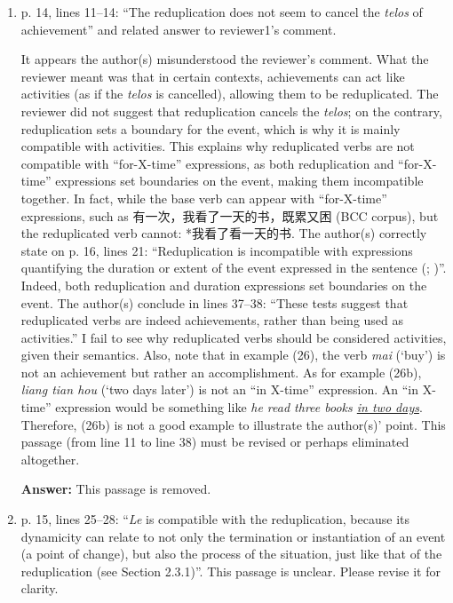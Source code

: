 \documentclass[fleqn,twoside]{article}
\begin{document}
\begin{enumerate}
\z

\item p. 14, lines 11--14: ``The reduplication does not seem to cancel the \textit{telos} of achievement'' and related
answer to reviewer1’s comment.

It appears the author(s) misunderstood the reviewer’s comment. What the reviewer meant was that in
certain contexts, achievements can act like activities (as if the \textit{telos} is cancelled), allowing them to be
reduplicated. The reviewer did not suggest that reduplication cancels the \textit{telos}; on the contrary,
reduplication sets a boundary for the event, which is why it is mainly compatible with activities. This
explains why reduplicated verbs are not compatible with ``for-X-time'' expressions, as both
reduplication and ``for-X-time'' expressions set boundaries on the event, making them incompatible
together. In fact, while the base verb can appear with ``for-X-time'' expressions, such as 有一次，我看了一天的书，既累又困 (BCC corpus), but the reduplicated verb cannot: *我看了看一天的书.
The author(s) correctly state on p. 16, lines 21: ``Reduplication is incompatible with expressions
quantifying the duration or extent of the event expressed in the sentence (\citealt[83--84]{Li1998}; \citealt[114--115]{Chen2005})''. Indeed, both reduplication and duration expressions set boundaries on the event.
The author(s) conclude in lines 37--38: ``These tests suggest that reduplicated verbs are indeed
achievements, rather than being used as activities.'' I fail to see why reduplicated verbs should be
considered activities, given their semantics. Also, note that in example (26), the verb \textit{mai} (`buy') is
not an achievement but rather an accomplishment. As for example (26b), \textit{liang tian hou} (`two days
later') is not an ``in X-time'' expression. An ``in X-time'' expression would be something like \textit{he read
three books \ul{in two days}}. Therefore, (26b) is not a good example to illustrate the author(s)' point.
This passage (from line 11 to line 38) must be revised or perhaps eliminated altogether.

\noindent
\textbf{Answer:} This passage is removed.

\item p. 15, lines 25--28: ``\textit{Le} is compatible with the reduplication, because its dynamicity can relate to not
only the termination or instantiation of an event (a point of change), but also the process of the
situation, just like that of the reduplication (see Section 2.3.1)''. This passage is unclear. Please revise
it for clarity.


\end{enumerate}
\end{document}
